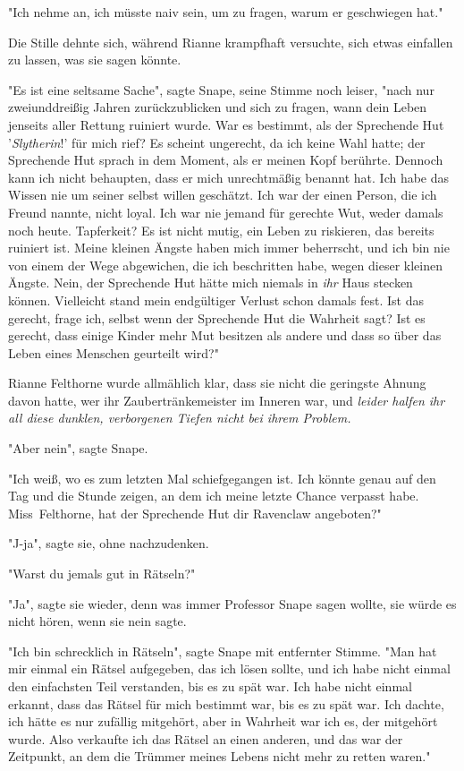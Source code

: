 {"Ich nehme an, ich müsste naiv sein, um zu fragen, warum er geschwiegen hat."

Die Stille dehnte sich, während Rianne krampfhaft versuchte, sich etwas einfallen zu lassen, was sie sagen könnte.

"Es ist eine seltsame Sache", sagte Snape, seine Stimme noch leiser, "nach nur zweiunddreißig Jahren zurückzublicken und sich zu fragen, wann dein Leben jenseits aller Rettung ruiniert wurde. War es bestimmt, als der Sprechende Hut '\emph{Slytherin}!' für mich rief? Es scheint ungerecht, da ich keine Wahl hatte; der Sprechende Hut sprach in dem Moment, als er meinen Kopf berührte. Dennoch kann ich nicht behaupten, dass er mich unrechtmäßig benannt hat. Ich habe das Wissen nie um seiner selbst willen geschätzt. Ich war der einen Person, die ich Freund nannte, nicht loyal. Ich war nie jemand für gerechte Wut, weder damals noch heute. Tapferkeit? Es ist nicht mutig, ein Leben zu riskieren, das bereits ruiniert ist. Meine kleinen Ängste haben mich immer beherrscht, und ich bin nie von einem der Wege abgewichen, die ich beschritten habe, wegen dieser kleinen Ängste. Nein, der Sprechende Hut hätte mich niemals in \emph{ihr} Haus stecken können. Vielleicht stand mein endgültiger Verlust schon damals fest. Ist das gerecht, frage ich, selbst wenn der Sprechende Hut die Wahrheit sagt? Ist es gerecht, dass einige Kinder mehr Mut besitzen als andere und dass so über das Leben eines Menschen geurteilt wird?"

Rianne Felthorne wurde allmählich klar, dass sie nicht die geringste Ahnung davon hatte, wer ihr Zaubertränkemeister im Inneren war, und \emph{leider halfen ihr all diese dunklen, verborgenen Tiefen nicht bei ihrem Problem.}

"Aber nein", sagte Snape.

"Ich weiß, wo es zum letzten Mal schiefgegangen ist. Ich könnte genau auf den Tag und die Stunde zeigen, an dem ich meine letzte Chance verpasst habe. Miss~Felthorne, hat der Sprechende Hut dir Ravenclaw angeboten?"

"J-ja", sagte sie, ohne nachzudenken.

"Warst du jemals gut in Rätseln?"

"Ja", sagte sie wieder, denn was immer Professor Snape sagen wollte, sie würde es nicht hören, wenn sie nein sagte.

"Ich bin schrecklich in Rätseln", sagte Snape mit entfernter Stimme. "Man hat mir einmal ein Rätsel aufgegeben, das ich lösen sollte, und ich habe nicht einmal den einfachsten Teil verstanden, bis es zu spät war. Ich habe nicht einmal erkannt, dass das Rätsel für mich bestimmt war, bis es zu spät war. Ich dachte, ich hätte es nur zufällig mitgehört, aber in Wahrheit war ich es, der mitgehört wurde. Also verkaufte ich das Rätsel an einen anderen, und das war der Zeitpunkt, an dem die Trümmer meines Lebens nicht mehr zu retten waren."

}
